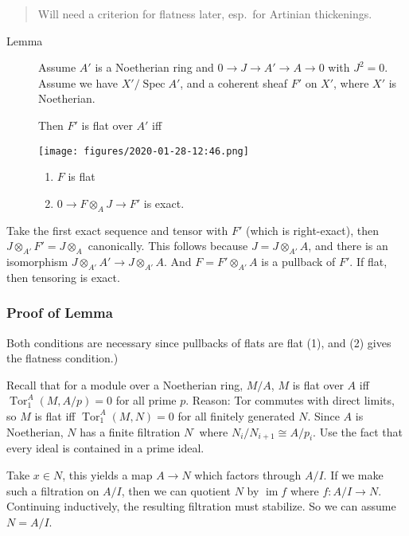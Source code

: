 \begin{quote}
Will need a criterion for flatness later, esp.~for Artinian thickenings.
\end{quote}

\begin{description}
\item[Lemma]
Assume \(A'\) is a Noetherian ring and \(0 \to J \to A' \to A \to 0\)
with \(J^2 = 0\). Assume we have \(X' / \operatorname{Spec}A'\), and a
coherent sheaf \(F'\) on \(X'\), where \(X'\) is Noetherian.

Then \(F'\) is flat over \(A'\) iff

\texttt{[image: figures/2020-01-28-12:46.png]}\\

\begin{enumerate}
\def\labelenumi{\arabic{enumi}.}
\tightlist
\item
  \(F\) is flat
\item
  \(0 \to F\otimes_A J \to F'\) is exact.
\end{enumerate}
\end{description}

Take the first exact sequence and tensor with \(F'\) (which is
right-exact), then \(J \otimes_{A'} F' = J \otimes_A\) canonically. This
follows because \(J = J \otimes_{A'} A\), and there is an isomorphism
\(J \otimes_{A'} A' \to J \otimes_{A'} A\). And
\(F = F' \otimes_{A'} A\) is a pullback of \(F'\). If flat, then
tensoring is exact.

\hypertarget{proof-of-lemma}{%
\subsubsection{Proof of Lemma}\label{proof-of-lemma}}

Both conditions are necessary since pullbacks of flats are flat (1), and
(2) gives the flatness condition.)

Recall that for a module over a Noetherian ring, \(M/A\), \(M\) is flat
over \(A\) iff \(\operatorname{Tor}_1^A(M, A/p) = 0\) for all prime
\(p\). Reason: Tor commutes with direct limits, so \(M\) is flat iff
\(\operatorname{Tor}_1^A(M, N) = 0\) for all finitely generated \(N\).
Since \(A\) is Noetherian, \(N\) has a finite filtration \(N^\cdot\)
where \(N_i / N_{i+1} \cong A/p_i\). Use the fact that every ideal is
contained in a prime ideal.

Take \(x\in N\), this yields a map \(A\to N\) which factors through
\(A/I\). If we make such a filtration on \(A/I\), then we can quotient
\(N\) by \(\operatorname{im}f\) where \(f: A/I \to N\). Continuing
inductively, the resulting filtration must stabilize. So we can assume
\(N = A/I\).

